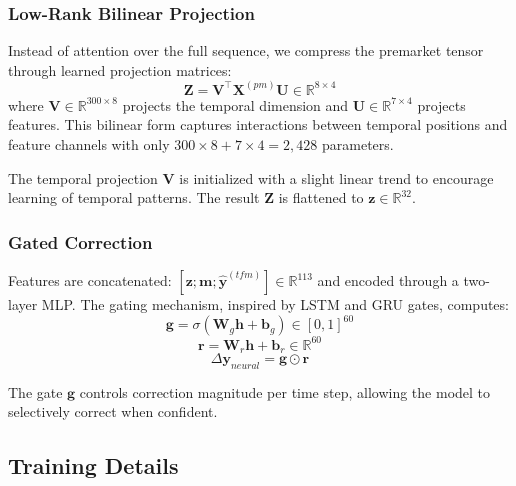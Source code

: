 \documentclass[10pt,conference]{IEEEtran}
\begin{document}
\subsubsection{Low-Rank Bilinear Projection}

Instead of attention over the full sequence, we compress the premarket tensor through learned projection matrices:
\begin{equation}
    \mathbf{Z} = \mathbf{V}^\top \mathbf{X}^{(pm)} \mathbf{U} \in \mathbb{R}^{8 \times 4}
\end{equation}
where $\mathbf{V} \in \mathbb{R}^{300 \times 8}$ projects the temporal dimension and $\mathbf{U} \in \mathbb{R}^{7 \times 4}$ projects features. This bilinear form \cite{tenenbaum2000separating} captures interactions between temporal positions and feature channels with only $300 \times 8 + 7 \times 4 = 2,428$ parameters.

The temporal projection $\mathbf{V}$ is initialized with a slight linear trend to encourage learning of temporal patterns. The result $\mathbf{Z}$ is flattened to $\mathbf{z} \in \mathbb{R}^{32}$.

\subsubsection{Gated Correction}

Features are concatenated: $[\mathbf{z}; \mathbf{m}; \hat{\mathbf{y}}^{(tfm)}] \in \mathbb{R}^{113}$ and encoded through a two-layer MLP. The gating mechanism, inspired by LSTM \cite{hochreiter1997long} and GRU \cite{cho2014learning} gates, computes:
\begin{equation}
    \mathbf{g} = \sigma(\mathbf{W}_g \mathbf{h} + \mathbf{b}_g) \in [0,1]^{60}
\end{equation}
\begin{equation}
    \mathbf{r} = \mathbf{W}_r \mathbf{h} + \mathbf{b}_r \in \mathbb{R}^{60}
\end{equation}
\begin{equation}
    \Delta\mathbf{y}_{neural} = \mathbf{g} \odot \mathbf{r}
\end{equation}

The gate $\mathbf{g}$ controls correction magnitude per time step, allowing the model to selectively correct when confident.

\subsection{Training Details}
\end{document}
